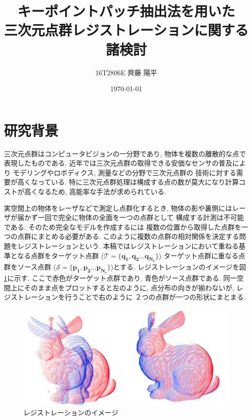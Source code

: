 \documentclass[twocolumn, 9pt, a4j, dvipdfmx]{jsarticle}
\title{
    キーポイントパッチ抽出法を用いた\\
    三次元点群レジストレーションに関する諸検討
}
\author{16T2806E 齊藤 陽平}
\date{\today}
\begin{document}
\maketitle
\section{研究背景}
三次元点群はコンピュータビジョンの一分野であり, 
物体を複数の離散的な点で表現したものである.
近年では三次元点群の取得できる安価なセンサの普及により
モデリングやロボディクス, 測量などの分野で三次元点群の
技術に対する需要が高くなっている. 
特に三次元点群処理は構成する点の数が莫大になり計算コストが高くなるため, 
高能率な手法が求められている.

実空間上の物体をレーザなどで測定し点群化するとき,
物体の影や裏側にはレーザが届かず一回で完全に物体の全面を一つの点群として
構成する計測は不可能である.
そのため完全なモデルを作成するには
複数の位置から取得した点群を一つの点群にまとめる必要がある. 
このように複数の点群の相対関係を決定する問題をレジストレーションという. 
本稿ではレジストレーションにおいて重ねる基準となる点群をターゲット点群
($\mathcal{T}=\{\bm{q_1}, \bm{q_2}\ldots\bm{q_{N_t}}\}$)
ターゲット点群に重なる点群をソース点群
($\mathcal{S}=\{\bm{p_1}, \bm{p_2}\ldots\bm{p_{N_s}}\}$)とする. 
レジストレーションのイメージを図\ref{registration}に示す. 
ここで赤色がターゲット点群であり, 青色がソース点群である. 
同一空間上にそのまま点をプロットすると左のように, 
点分布の向きが揃わないが, レジストレーションを行うことで右のように
２つの点群が一つの形状にまとまる. 
\vspace{-2mm}
\begin{figure}[H]
    \centering
    \includegraphics[clip, width=0.8\linewidth]{./img/registration.png}
    \caption{レジストレーションのイメージ\label{registration}}
\end{figure}
\vspace{-5mm}
\end{document}
